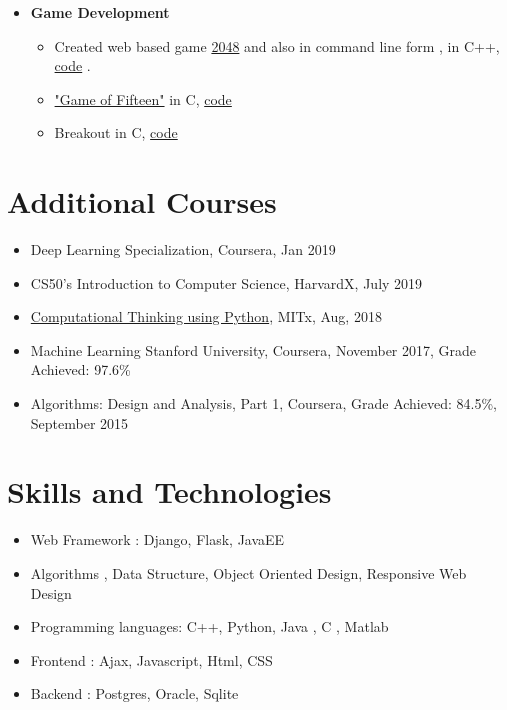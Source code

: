 \documentclass[a4paper,10pt]{article}
\begin{document}
\begin{itemize}
                			
				\item \textbf{Game Development} 
				    \begin{itemize}
				    \item 
				    Created web based game \href{https://gitlab.com/psonlinux/2048-game-web}{2048} and also in command line form , in C++, \href{https://gitlab.com/psonlinux/2048}{code} .
				        \item \href{https://en.wikipedia.org/wiki/15_puzzle}{"Game of Fifteen"} in C, \href{https://gitlab.com/psonlinux/game-of-fifteen}{code}
\item Breakout in C, \href{https://gitlab.com/psonlinux/breakout}{code}				    
				    \end{itemize}
			\end{itemize}
			
    \section{Additional Courses}
	\begin{itemize}
	        \item Deep Learning Specialization, Coursera, Jan 2019
            \item CS50's Introduction to Computer Science, HarvardX, July 2019
	        \item \href{https://credentials.edx.org/credentials/bc6063317f6249019179899eb0c5aacb/}{Computational Thinking using Python}, MITx, Aug, 2018
	        \item Machine Learning Stanford University, Coursera, November 2017, Grade Achieved: 97.6\%
	        \item Algorithms: Design and Analysis, Part 1, Coursera, Grade Achieved: 84.5\%, September 2015
	    \end{itemize}
	
	\section{Skills and Technologies}
	\begin{itemize}
		\item Web Framework : Django, Flask, JavaEE
		\item Algorithms , Data Structure, Object Oriented Design, Responsive Web Design
        		\item Programming languages: C++, Python, Java , C , Matlab 
		\item Frontend : Ajax, Javascript, Html, CSS
		\item Backend : Postgres, Oracle, Sqlite
	\end{itemize}
	
\end{document}

